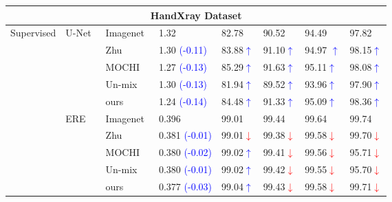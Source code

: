 \documentclass[10pt,twocolumn,letterpaper]{article}
\begin{document}
\begin{table*}[t]
\begin{threeparttable}
\begin{tabular}{l|l|l|lllll}
\multicolumn{8}{c}{HandXray Dataset} \\ 
\hline
\multirow{15}{*}{Supervised} & \multirow{5}{*}{U-Net~\cite{unet}} & Imagenet~\cite{DBLP:conf/cvpr/DengDSLL009} & 1.32 & 82.78 & 90.52 & 94.49 & 97.82 \\
 &  & Zhu~\cite{zhu2021improving}  & 1.30 \textcolor{blue}{(-0.11)} & 83.88\textcolor{blue}{$\uparrow$} & 91.10\textcolor{blue}{$\uparrow$} & 94.97 \textcolor{blue}{$\uparrow$} & 98.15\textcolor{blue}{$\uparrow$}\\
 &  & MOCHI~\cite{kalantidis2020hard} & 1.27 \textcolor{blue}{(-0.13)} & 85.29\textcolor{blue}{$\uparrow$} & 91.63\textcolor{blue}{$\uparrow$} & 95.11\textcolor{blue}{$\uparrow$} & 98.08\textcolor{blue}{$\uparrow$}\\
 & & Un-mix~\cite{shen2022mix} & 1.30 \textcolor{blue}{(-0.13)} & 81.94\textcolor{blue}{$\uparrow$} & 89.52\textcolor{blue}{$\uparrow$} & 93.96\textcolor{blue}{$\uparrow$} & 97.90\textcolor{blue}{$\uparrow$} \\
 & & ours  & 1.24 \textcolor{blue}{(-0.14)} & 84.48\textcolor{blue}{$\uparrow$} & 91.33\textcolor{blue}{$\uparrow$} & 95.09\textcolor{blue}{$\uparrow$} & 98.36\textcolor{blue}{$\uparrow$}\\
\cline{2-8}
 & \multirow{5}{*}{ERE~\cite{McCouat_2022_CVPR}} & Imagenet~\cite{DBLP:conf/cvpr/DengDSLL009} & 0.396 & 99.01 & 99.44 & 99.64 & 99.74 \\
 & & Zhu~\cite{zhu2021improving} & 0.381 \textcolor{blue}{(-0.01)} & 99.01\textcolor{red}{$\downarrow$} & 99.38\textcolor{red}{$\downarrow$} & 99.58\textcolor{red}{$\downarrow$} & 99.70\textcolor{red}{$\downarrow$} \\
 & & MOCHI~\cite{kalantidis2020hard} & 0.380 \textcolor{blue}{(-0.02)} & 99.02\textcolor{blue}{$\uparrow$} & 99.41\textcolor{red}{$\downarrow$} & 99.56\textcolor{red}{$\downarrow$} & 95.71\textcolor{red}{$\downarrow$}\\
 & & Un-mix~\cite{shen2022mix}  & 0.380 \textcolor{blue}{(-0.01)} & 99.02\textcolor{blue}{$\uparrow$} & 99.42\textcolor{red}{$\downarrow$} & 99.55\textcolor{red}{$\downarrow$} & 95.70\textcolor{red}{$\downarrow$} \\
 & & ours  & 0.377 \textcolor{blue}{(-0.03)} & 99.04\textcolor{blue}{$\uparrow$} & 99.43\textcolor{red}{$\downarrow$} & 99.58\textcolor{red}{$\downarrow$} & 99.71\textcolor{red}{$\downarrow$}\\
 

\end{tabular}
\end{threeparttable}
\end{table*}
\end{document}
